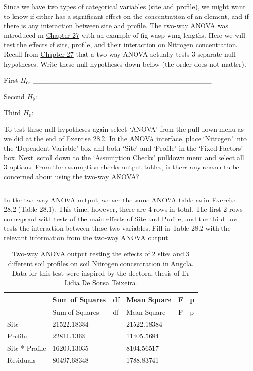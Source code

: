 \documentclass[
]{scrbook}
\begin{document}
Since we have two types of categorical variables (site and profile), we might want to know if either has a significant effect on the concentration of an element, and if there is any interaction between site and profile.
The two-way ANOVA was introduced in \protect\hyperlink{Chapter_27}{Chapter 27} with an example of fig wasp wing lengths.
Here we will test the effects of site, profile, and their interaction on Nitrogen concentration.
Recall from \protect\hyperlink{Chapter_27}{Chapter 27} that a two-way ANOVA actually tests 3 separate null hypotheses.
Write these null hypotheses down below (the order does not matter).

First \(H_{0}\): \_\_\_\_\_\_\_\_\_\_\_\_\_\_\_\_\_\_\_\_\_\_\_\_\_\_\_\_\_\_\_\_\_\_\_

Second \(H_{0}\): \_\_\_\_\_\_\_\_\_\_\_\_\_\_\_\_\_\_\_\_\_\_\_\_\_\_\_\_\_\_\_\_\_\_\_

Third \(H_{0}\): \_\_\_\_\_\_\_\_\_\_\_\_\_\_\_\_\_\_\_\_\_\_\_\_\_\_\_\_\_\_\_\_\_\_\_

To test these null hypotheses again select `ANOVA' from the pull down menu as we did at the end of Exercise 28.2.
In the ANOVA interface, place `Nitrogen' into the `Dependent Variable' box and both `Site' and `Profile' in the `Fixed Factors' box.
Next, scroll down to the `Assumption Checks' pulldown menu and select all 3 options.
From the assumption checks output tables, is there any reason to be concerned about using the two-way ANOVA?

\begin{verbatim}
\end{verbatim}

In the two-way ANOVA output, we see the same ANOVA table as in Exercise 28.2 (Table 28.1).
This time, however, there are 4 rows in total.
The first 2 rows correspond with tests of the main effects of Site and Profile, and the third row tests the interaction between these two variables.
Fill in Table 28.2 with the relevant information from the two-way ANOVA output.

\begin{longtable}[]{@{}llllll@{}}
\caption{\label{tab:unnamed-chunk-133}Two-way ANOVA output testing the effects of 2 sites and 3 different soil profiles on soil Nitrogen concentration in Angola. Data for this test were inspired by the doctoral thesis of Dr Lidia De Sousa Teixeira.}\tabularnewline
\toprule
& Sum of Squares & df & Mean Square & F & p \\
\midrule
\endfirsthead
\toprule
& Sum of Squares & df & Mean Square & F & p \\
\midrule
\endhead
Site & 21522.18384 & & 21522.18384 & & \\
Profile & 22811.1368 & & 11405.5684 & & \\
Site * Profile & 16209.13035 & & 8104.56517 & & \\
Residuals & 80497.68348 & & 1788.83741 & & \\
\bottomrule
\end{longtable}
\end{document}
